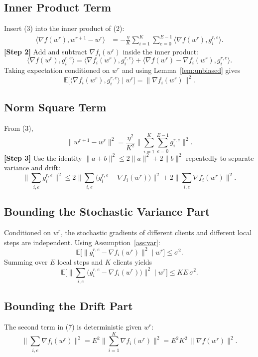 \documentclass{article}
\newcommand{\EE}{\mathbb{E}}
\begin{document}
\subsection*{Inner Product Term}
Insert (3) into the inner product of (2):
\begin{align}
    \big\langle\nabla f(w^{r}),w^{r+1}-w^{r}\big\rangle
    &= -\frac{\eta}{K}\sum_{i=1}^{K}\sum_{e=0}^{E-1}
       \big\langle\nabla f(w^{r}), g_{i}^{r,e}\big\rangle. \tag{4}
\end{align}
\noindent\textbf{[Step 2]} Add and subtract $\nabla f_i(w^{r})$ inside the inner product:
\[
\langle\nabla f(w^{r}), g_{i}^{r,e}\rangle
 =\langle\nabla f_i(w^{r}), g_{i}^{r,e}\rangle
   +\langle\nabla f(w^{r})-\nabla f_i(w^{r}), g_{i}^{r,e}\rangle.
\]
Taking expectation conditioned on $w^{r}$ and using Lemma~\ref{lem:unbiased} gives
\[
\EE\!\big[\langle\nabla f_i(w^{r}), g_{i}^{r,e}\rangle\mid w^{r}\big]
   =\|\nabla f_i(w^{r})\|^{2}. \tag{5}
\]

\subsection*{Norm Square Term}
From (3),
\[
\|w^{r+1}-w^{r}\|^{2}
   =\frac{\eta^{2}}{K^{2}}
     \Big\|\sum_{i=1}^{K}\sum_{e=0}^{E-1} g_{i}^{r,e}\Big\|^{2}. \tag{6}
\]
\noindent\textbf{[Step 3]} Use the identity $\|a+b\|^{2}\le 2\|a\|^{2}+2\|b\|^{2}$ repeatedly to separate variance and drift:
\[
\Big\|\sum_{i,e} g_{i}^{r,e}\Big\|^{2}
\le 2\Big\|\sum_{i,e}\big(g_{i}^{r,e}-\nabla f_i(w^{r})\big)\Big\|^{2}
   +2\Big\|\sum_{i,e}\nabla f_i(w^{r})\Big\|^{2}. \tag{7}
\]

\subsection*{Bounding the Stochastic Variance Part}
Conditioned on $w^{r}$, the stochastic gradients of different clients and different local steps are independent. Using Assumption~\ref{ass:var}:
\[
\EE\!\Big[\big\|g_{i}^{r,e}-\nabla f_i(w^{r})\big\|^{2}\mid w^{r}\Big]\le\sigma^{2}.
\]
Summing over $E$ local steps and $K$ clients yields
\[
\EE\!\Big[\Big\|\sum_{i,e}\big(g_{i}^{r,e}-\nabla f_i(w^{r})\big)\Big\|^{2}\mid w^{r}\Big]
   \le K E\,\sigma^{2}. \tag{8}
\]

\subsection*{Bounding the Drift Part}
The second term in (7) is deterministic given $w^{r}$:
\[
\Big\|\sum_{i,e}\nabla f_i(w^{r})\Big\|^{2}
   =E^{2}\Big\|\sum_{i=1}^{K}\nabla f_i(w^{r})\Big\|^{2}
   =E^{2}K^{2}\,\big\|\nabla f(w^{r})\big\|^{2}. \tag{9}
\]
\end{document}
